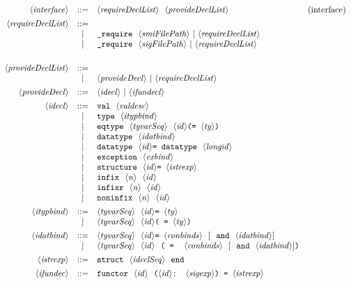 \documentclass{jbook}
\newcommand{\vbar}{\mbox{\ |\ }}
\newcommand{\code}[1]{\mbox{{\tt #1}}}
\newcommand{\nonterm}[1]{\mbox{$\langle$}{\it #1}\mbox{$\rangle$}}
\newcommand{\sep}{\mbox{\ \ }}
\begin{document}
\[
\begin{array}{rcll}
\nonterm{interface} &::=& 
\nonterm{requireDeclList}\mbox{\ \ }\nonterm{provideDeclList} & \mbox{(interface)}
\\[1ex]
\nonterm{requireDeclList} &::=& \\
&|& \code{\_require}\sep\nonterm{smiFilePath}\vbar \nonterm{requireDeclList}\\
&|& \code{\_require}\sep\nonterm{sigFilePath}\vbar \nonterm{requireDeclList}\\
\\[1ex]
\nonterm{provideDeclList} &::=& \\
&|& \nonterm{provideDecl}\vbar \nonterm{requireDeclList}
\\[1ex]
\nonterm{provideDecl} &::=& \nonterm{idecl} \vbar \nonterm{ifundecl}
\\[1ex]
\nonterm{idecl} &::=& \code{val}\sep\nonterm{valdesc}\\
&|& \code{type}\sep\nonterm{itypbind}\\
&|& \code{eqtype}\sep\nonterm{tyvarSeq}\sep\nonterm{id}\code{(= }\nonterm{ty}\code{)}\\
&|& \code{datatype}\sep\nonterm{idatbind}\\
&|& \code{datatype}\sep\nonterm{id}\code{ = datatype}\sep\nonterm{longid}\\
&|& \code{exception}\sep\nonterm{exbind}\\
&|& \code{structure}\sep\nonterm{id}\code{ = }\nonterm{istrexp}\\
&|& \code{infix}\sep\nonterm{n}\sep\nonterm{id}\\
&|& \code{infixr}\sep\nonterm{n}\sep\nonterm{id}\\
&|& \code{noninfix}\sep\nonterm{n}\sep\nonterm{id}
\\[1ex]
\nonterm{itypbind} &::=& \nonterm{tyvarSeq}\sep\nonterm{id}\code{ = }\nonterm{ty}\\
        &|& \nonterm{tyvarSeq}\sep\nonterm{id} \code{( = }\nonterm{ty} \code{)}
\\[1ex]
\nonterm{idatbind} &::=& \nonterm{tyvarSeq}\sep\nonterm{id} \code{ = }
    \nonterm{conbinds}\sep $[$\sep\code{and}\sep\nonterm{idatbind} $]$
\\
 &|& \nonterm{tyvarSeq}\sep\nonterm{id}\sep
      \code{( = }\sep\nonterm{conbinds}\sep $[$\sep\code{and}\sep\nonterm{idatbind} $]$ \code{)}
\\[1ex]
\nonterm{istrexp} 
 &::=& \code{struct}\sep\nonterm{ideclSeq}\sep\code{end}
\\[1ex]
\nonterm{ifundec}
 &::=& \code{functor}\sep\nonterm{id}\sep\code{(}\nonterm{id}\code{ : }\nonterm{sigexp}\code{ )  = }\nonterm{istrexp}
\end{array}
\]
\end{document}
